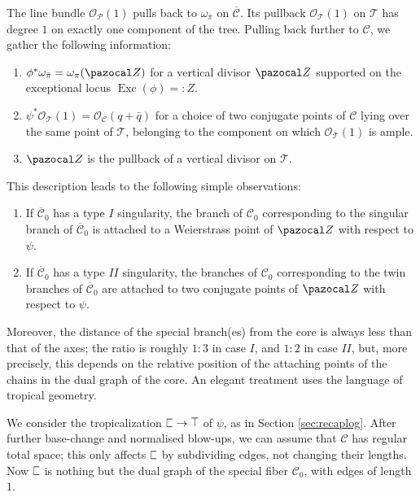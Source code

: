 \documentclass{compositio}
\newcommand{\tropC}{\scalebox{0.8}[1.3]{$\sqsubset$}}
\newcommand{\tropT}{\scalebox{0.9}[1.2]{$\top$}}
\newcommand{\OO}{\mathcal O}
\renewcommand{\to}{\rightarrow}
\theoremstyle{plain}
\theoremstyle{definition}
\theoremstyle{remark}
\begin{document}
 The line bundle $\OO_{\mathcal P}(1)$ pulls back to $\omega_{\bar \pi}$ on $\overline{\mathcal C}$. Its pullback $\OO_{\mathcal T}(1)$ on $\mathcal T$ has degree $1$ on exactly one component of the tree. Pulling back further to $\mathcal C$, we gather the following information:
 \begin{enumerate}[label=(\alph*)]
  \item $\phi^*\omega_{\bar\pi}=\omega_{\pi}(\pazocal Z)$ for a vertical divisor $\pazocal Z$ supported on the exceptional locus $\operatorname{Exc}(\phi)=: Z$.
  \item $\psi^*\OO_{\mathcal T}(1)=\OO_{\mathcal C}(q+\bar q)$ for a choice of two conjugate points of $\mathcal C$ lying over the same point of $\mathcal T$, belonging to the component on which $\OO_{\mathcal T}(1)$ is ample.
  \item\label{pt:compatibleZ} $\pazocal Z$ is the pullback of a vertical divisor on $\mathcal T$.
 \end{enumerate}
 
 This description leads to the following simple observations:
 
 \begin{enumerate}[label=(\Roman*)]
  \item If $\overline{\mathcal C}_0$ has a type $I$ singularity, the branch of ${\mathcal C}_0$ corresponding to the singular branch of $\overline{\mathcal C}_0$ is attached to a Weierstrass point of $\pazocal Z$ with respect to $\psi$.
  \item If $\overline{\mathcal C}_0$ has a type $I\!I$ singularity, the branches of ${\mathcal C}_0$ corresponding to the twin branches of $\overline{\mathcal C}_0$ are attached to two conjugate points of $\pazocal Z$ with respect to $\psi$.
 \end{enumerate}

 Moreover, the distance of the special branch(es) from the core is always less than that of the axes; the ratio is roughly $1:3$ in case $I$, and $1:2$ in case $I\!I$, but, more precisely, this depends on the relative position of the attaching points of the chains in the dual graph of the core. An elegant treatment uses the language of tropical geometry.

 We consider the tropicalization $\tropC\to\tropT$ of $\psi$, as in Section \ref{sec:recaplog}. After further base-change and normalised blow-ups, we can assume that $\mathcal C$ has regular total space; this only affects $\tropC$ by subdividing edges, not changing their lengths. Now $\tropC$ is nothing but the dual graph of the special fiber $\mathcal C_0$, with edges of length $1$.
 
\end{document}
